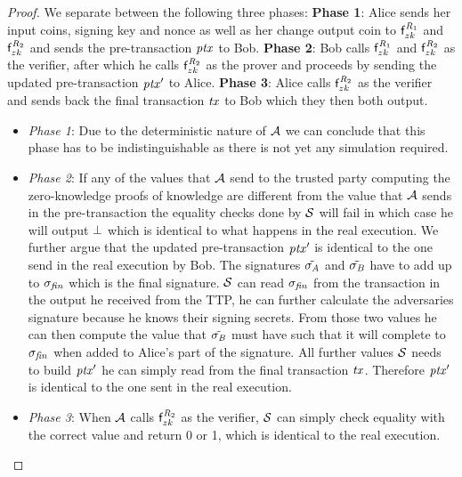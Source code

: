 \begin{proof}
    We separate between the following three phases:
    \textbf{Phase 1}: Alice sends her input coins, signing key and nonce as well as her change output coin to $\mathsf{f}^{\mathit{R}_1}_{zk}$ and $\mathsf{f}^{\mathit{R}_2}_{zk}$ and sends the pre-transaction $\mathit{ptx}$ to Bob.
    \textbf{Phase 2}: Bob calls $\mathsf{f}^{\mathit{R}_1}_{zk}$ and $\mathsf{f}^{\mathit{R}_2}_{zk}$ as the verifier, after which he calls $\mathsf{f}^{\mathit{R}_2}_{zk}$ as the prover and proceeds by sending the updated pre-transaction ${\mathit{ptx}}'$ to Alice.
    \textbf{Phase 3}: Alice calls $\mathsf{f}^{\mathit{R}_2}_{zk}$ as the verifier and sends back the final transaction $\mathit{tx}$ to Bob which they then both output.

    \begin{itemize}
        \item \textit{Phase 1}: Due to the deterministic nature of $\mathcal{A}$ we can conclude that this phase has to be indistinguishable as there is not yet any simulation required.
        \item \textit{Phase 2}: If any of the values that $\mathcal{A}$ send to the trusted party computing the zero-knowledge proofs of knowledge are different from the value that $\mathcal{A}$ sends in the pre-transaction the equality checks done by $\mathcal{S}$ will fail in which case he will output $\bot$ which is identical to what happens in the real execution.
        We further argue that the updated pre-transaction ${\mathit{ptx}}'$ is identical to the one send in the real execution by Bob.
        The signatures $\tilde{\sigma_{\mathit{A}}}$ and $\tilde{\sigma_{\mathit{B}}}$ have to add up to $\sigma_{\mathit{fin}}$ which is the final signature.
        $\mathcal{S}$ can read $\sigma_{\mathit{fin}}$ from the transaction in the output he received from the TTP, he can further calculate the adversaries signature because he knows their signing secrets.
        From those two values he can then compute the value that $\tilde{\sigma_{\mathit{B}}}$ must have such that it will complete to $\sigma_{\mathit{fin}}$ when added to Alice's part of the signature.
        All further values $\mathcal{S}$ needs to build ${\mathit{ptx}}'$ he can simply read from the final transaction $\mathit{tx}$.
        Therefore ${\mathit{ptx}}'$ is identical to the one sent in the real execution.
        \item \textit{Phase 3}: When $\mathcal{A}$ calls $\mathsf{f}^{\mathit{R}_2}_{zk}$ as the verifier, $\mathcal{S}$ can simply check equality with the correct value and return 0 or 1, which is identical to the real execution. 
    \end{itemize}
    


\end{proof}
